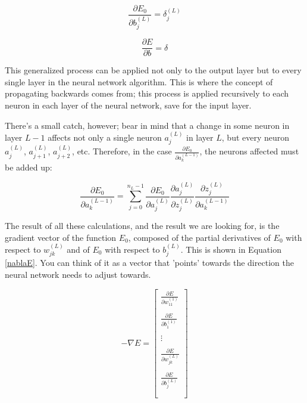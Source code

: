 \documentclass[12pt]{article}
\begin{document}
\[ \frac{\partial E_0}{\partial b_j^{(L)}} = \delta_j^{(L)}\]

\begin{equation} \label{general-delta-dEB}
  \frac{\partial E}{\partial b} = \delta
\end{equation}


This generalized process can be applied not only to the output layer but to every single layer in the neural network algorithm. This is where the concept of propagating backwards comes from; this process is applied recursively to each neuron in each layer of the neural network, save for the input layer.

There's a small catch, however; bear in mind that a change in some neuron in layer $L-1$ affects not only a single neuron $a_j^{(L)}$ in layer $L$, but every neuron $a_j^{(L)}$, $a_{j+1}^{(L)}$, $a_{j+2}^{(L)}$, etc. Therefore, in the case $ \frac{\partial E_0}{\partial a_k^{(L-1)}} $, the neurons affected must be added up:

\[ \frac{\partial E_0}{\partial a_k^{(L-1)}} = \sum_{j=0}^{n_L-1} \frac{\partial E_0}{\partial a_j^{(L)}} \frac{\partial a_j^{(L)}}{\partial z_j^{(L)}} \frac{\partial z_j^{(L)}}{\partial a_k^{(L-1)}} \]

The result of all these calculations, and the result we are looking for, is the gradient vector of the function $E_0$, composed of the partial derivatives of $E_0$ with respect to $w_{jk}^{(L)}$ and of $E_0$ with respect to $b_j^{(L)}$. This is shown in Equation \ref{nablaE}. You can think of it as a vector that 'points' towards the direction the neural network needs to adjust towards.


\begin{equation} \label{nablaE}
  -\nabla E = \begin{bmatrix}
  \frac{\partial E}{\partial w_{11}^{(1)}} \\\\
  \frac{\partial E}{\partial b_1^{(1)}} \\\\
  \vdots \\\\
  \frac{\partial E}{\partial w_{jk}^{(L)}} \\\\
  \frac{\partial E}{\partial b_j^{(L)}} \\\\
  \end{bmatrix}
\end{equation}
\end{document}
